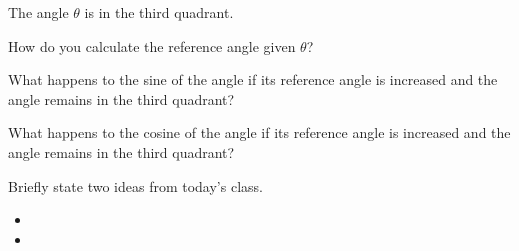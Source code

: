 \begin{problem}
  \clearpage

  \item The angle $\theta$ is in the third quadrant.
  \begin{subproblem}
    \item How do you calculate the reference angle given $\theta$?
      \vfill
    \item What happens to the sine of the angle if its reference angle is
      increased and the angle remains in the third quadrant?
      \vfill
    \item What happens to the cosine of the angle if its reference angle is
      increased and the angle remains in the third quadrant?
      \vfill
  \end{subproblem}

\end{problem}

\postClass

\begin{problem}
\item Briefly state two ideas from today's class.
  \begin{itemize}
  \item
  \item
  \end{itemize}
\item
  \begin{subproblem}
    \item
  \end{subproblem}
\end{problem}



